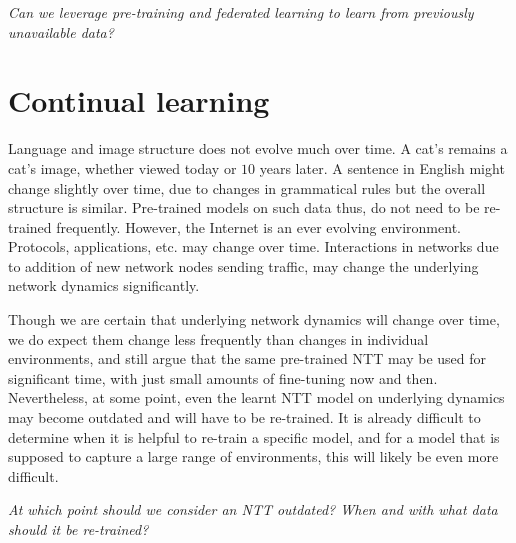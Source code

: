 \emph{Can we leverage pre-training and federated learning to learn from previously unavailable data?}

\section{Continual learning}
\label{sec:cont}

Language and image structure does not evolve much over time. A cat's remains a cat's image, whether viewed today or $10$ years later. A sentence in English might change slightly over time, due to changes in grammatical rules but the overall structure is similar. Pre-trained models on such data thus, do not need to be re-trained frequently. However, the Internet is an ever evolving environment. Protocols, applications, etc. may change over time. Interactions in networks due to addition of new network nodes sending traffic, may change the underlying network dynamics significantly.

Though we are certain that underlying network dynamics will change over time, we do expect them change less frequently than changes in individual environments, and still argue that the same pre-trained NTT may be used for significant time, with just small amounts of fine-tuning now and then. Nevertheless, at some point, even the learnt NTT model on underlying dynamics may become outdated and will have to be re-trained. It is already difficult to determine when it is helpful to re-train a specific model\cite{puffer}, and for a model that is supposed to capture a large range of environments, this will likely be even more difficult.

\emph{At which point should we consider an NTT outdated? When and with what data should it be re-trained?}





